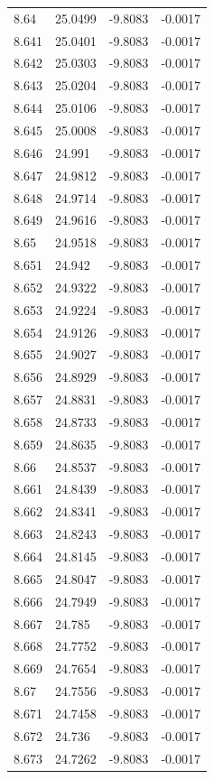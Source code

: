 \begin{tabular}{llll}
8.64 & 25.0499 & -9.8083 & -0.0017 \\
8.641 & 25.0401 & -9.8083 & -0.0017 \\
8.642 & 25.0303 & -9.8083 & -0.0017 \\
8.643 & 25.0204 & -9.8083 & -0.0017 \\
8.644 & 25.0106 & -9.8083 & -0.0017 \\
8.645 & 25.0008 & -9.8083 & -0.0017 \\
8.646 & 24.991 & -9.8083 & -0.0017 \\
8.647 & 24.9812 & -9.8083 & -0.0017 \\
8.648 & 24.9714 & -9.8083 & -0.0017 \\
8.649 & 24.9616 & -9.8083 & -0.0017 \\
8.65 & 24.9518 & -9.8083 & -0.0017 \\
8.651 & 24.942 & -9.8083 & -0.0017 \\
8.652 & 24.9322 & -9.8083 & -0.0017 \\
8.653 & 24.9224 & -9.8083 & -0.0017 \\
8.654 & 24.9126 & -9.8083 & -0.0017 \\
8.655 & 24.9027 & -9.8083 & -0.0017 \\
8.656 & 24.8929 & -9.8083 & -0.0017 \\
8.657 & 24.8831 & -9.8083 & -0.0017 \\
8.658 & 24.8733 & -9.8083 & -0.0017 \\
8.659 & 24.8635 & -9.8083 & -0.0017 \\
8.66 & 24.8537 & -9.8083 & -0.0017 \\
8.661 & 24.8439 & -9.8083 & -0.0017 \\
8.662 & 24.8341 & -9.8083 & -0.0017 \\
8.663 & 24.8243 & -9.8083 & -0.0017 \\
8.664 & 24.8145 & -9.8083 & -0.0017 \\
8.665 & 24.8047 & -9.8083 & -0.0017 \\
8.666 & 24.7949 & -9.8083 & -0.0017 \\
8.667 & 24.785 & -9.8083 & -0.0017 \\
8.668 & 24.7752 & -9.8083 & -0.0017 \\
8.669 & 24.7654 & -9.8083 & -0.0017 \\
8.67 & 24.7556 & -9.8083 & -0.0017 \\
8.671 & 24.7458 & -9.8083 & -0.0017 \\
8.672 & 24.736 & -9.8083 & -0.0017 \\
8.673 & 24.7262 & -9.8083 & -0.0017 \\

\end{tabular}
